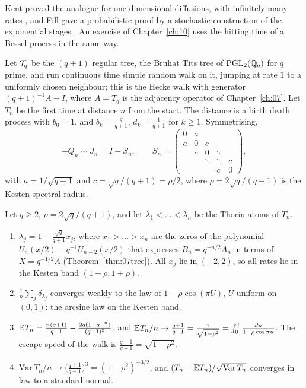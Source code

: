 Kent proved the analogue for one dimensional diffusions, with infinitely many rates \cite{kent1980}, and Fill gave a probabilistic proof by a stochastic construction of the exponential stages \cite{fill2009}. An exercise of Chapter~\ref{ch:10} uses the hitting time of a Bessel process in the same way.

Let $\mathcal{T}_q$ be the $(q+1)$ regular tree, the Bruhat Tits tree of $\mathrm{PGL}_2(\mathbb{Q}_q)$ for $q$ prime, and run continuous time simple random walk on it, jumping at rate $1$ to a uniformly chosen neighbour; this is the Hecke walk with generator $(q+1)^{-1}A-I$, where $A=T_q$ is the adjacency operator of Chapter~\ref{ch:07}. Let $T_n$ be the first time at distance $n$ from the start. The distance is a birth death process with $b_0=1$, and $b_k=\frac{q}{q+1}$, $d_k=\frac1{q+1}$ for $k\ge1$. Symmetrising,
\[
-Q_n\sim J_n=I-S_n,\qquad S_n=\begin{pmatrix}0&a&&&\\a&0&c&&\\&c&0&\ddots&\\&&\ddots&\ddots&c\\&&&c&0\end{pmatrix},
\]
with $a=1/\sqrt{q+1}$ and $c=\sqrt q/(q+1)=\rho/2$, where $\rho=2\sqrt q/(q+1)$ is the Kesten spectral radius.

\begin{theorem}\label{thm:10ctree}
Let $q\ge2$, $\rho=2\sqrt q/(q+1)$, and let $\lambda_1<\dots<\lambda_n$ be the Thorin atoms of $T_n$.
\begin{enumerate}
\item $\lambda_j=1-\frac{\sqrt q}{q+1}x_j$, where $x_1>\dots>x_n$ are the zeros of the polynomial $U_n(x/2)-q^{-1}U_{n-2}(x/2)$ that expresses $B_n=q^{-n/2}A_n$ in terms of $X=q^{-1/2}A$ (Theorem~\ref{thm:07tree}). All $x_j$ lie in $(-2,2)$, so all rates lie in the Kesten band $(1-\rho,1+\rho)$.
\item $\frac1n\sum_j\delta_{\lambda_j}$ converges weakly to the law of $1-\rho\cos(\pi U)$, $U$ uniform on $(0,1)$: the arcsine law on the Kesten band.
\item $\mathbb{E} T_n=\frac{n(q+1)}{q-1}-\frac{2q(1-q^{-n})}{(q-1)^2}$, and $\mathbb{E} T_n/n\to\frac{q+1}{q-1}=\frac1{\sqrt{1-\rho^2}}=\int_0^1\frac{du}{1-\rho\cos\pi u}$. The escape speed of the walk is $\frac{q-1}{q+1}=\sqrt{1-\rho^2}$.
\item $\mathrm{Var}\,T_n/n\to\bigl(\frac{q+1}{q-1}\bigr)^3=(1-\rho^2)^{-3/2}$, and $(T_n-\mathbb{E} T_n)/\sqrt{\mathrm{Var}\,T_n}$ converges in law to a standard normal.
\end{enumerate}
\end{theorem}

